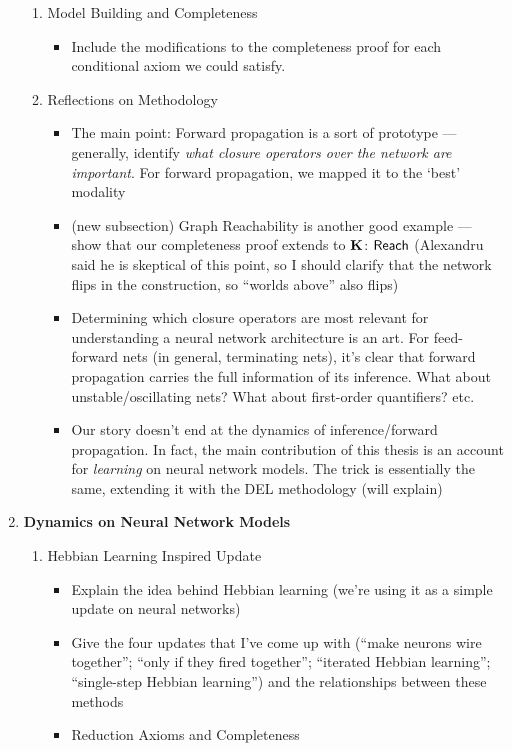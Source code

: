 \documentclass[letterpaper]{article}
\begin{document}
\begin{enumerate}
\begin{enumerate}
        \item Model Building and Completeness
        \begin{itemize}
            \item Include the modifications to the completeness proof for each conditional axiom we could satisfy.
        \end{itemize}
        
        \item Reflections on Methodology
        \begin{itemize}
            \item The main point: Forward propagation is a sort of prototype --- generally, identify \emph{what closure operators over the network are important}.  For forward propagation, we mapped it to the `best' modality
            \item (new subsection) Graph Reachability is another good example --- show that our completeness proof extends to $\textrm{\textup{\textbf{K}}}$: $\mathsf{Reach}$ (Alexandru said he is skeptical of this point, so I should clarify that the network flips in the construction, so ``worlds above'' also flips)
            \item Determining which closure operators are most relevant for understanding a neural network architecture is an art.  For feed-forward nets (in general, terminating nets), it's clear that forward propagation carries the full information of its inference.  What about unstable/oscillating nets?  What about first-order quantifiers? etc.
            \item Our story doesn't end at the dynamics of inference/forward propagation.  In fact, the main contribution of this thesis is an account for \emph{learning} on neural network models.  The trick is essentially the same, extending it with the DEL methodology (will explain)
        \end{itemize}

    \end{enumerate}

    \item \textbf{Dynamics on Neural Network Models}
    \begin{enumerate}
        \item Hebbian Learning Inspired Update
        \begin{itemize}
            \item Explain the idea behind Hebbian learning (we're using it as a simple update on neural networks)
            \item Give the four updates that I've come up with (``make neurons wire together''; ``only if they fired together''; ``iterated Hebbian learning''; ``single-step Hebbian learning'') and the relationships between these methods
            \item Reduction Axioms and Completeness
        \end{itemize}


\end{enumerate}
\end{enumerate}
\end{document}
